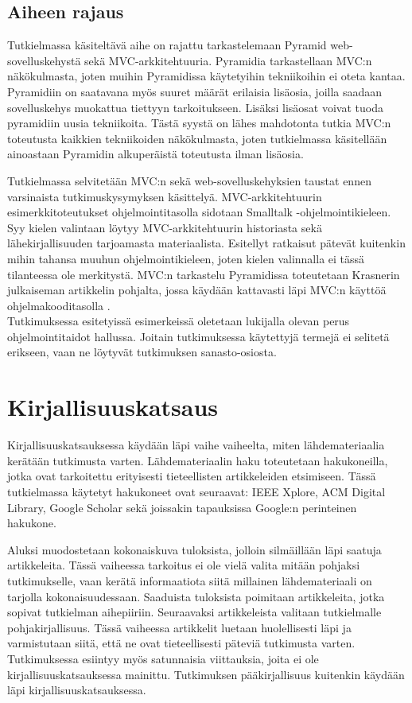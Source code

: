 \documentclass[finnish,utf8,nonumbib,palatino,kandi]{gradu2}
\begin{document}
\subsection{Aiheen rajaus}
Tutkielmassa käsiteltävä aihe on rajattu tarkastelemaan Pyramid web-sovelluskehystä sekä MVC-arkkitehtuuria. Pyramidia
tarkastellaan MVC:n näkökulmasta, joten muihin Pyramidissa käytetyihin tekniikoihin ei oteta kantaa. Pyramidiin on saatavana myös suuret määrät erilaisia lisäosia, 
joilla saadaan sovelluskehys muokattua tiettyyn tarkoitukseen. 
Lisäksi lisäosat voivat tuoda pyramidiin uusia tekniikoita. Tästä syystä on lähes mahdotonta tutkia MVC:n toteutusta kaikkien tekniikoiden näkökulmasta, 
joten tutkielmassa käsitellään ainoastaan Pyramidin alkuperäistä toteutusta ilman lisäosia.

Tutkielmassa selvitetään MVC:n sekä web-sovelluskehyksien taustat ennen varsinaista tutkimuskysymyksen käsittelyä. MVC-arkkitehtuurin esimerkkitoteutukset ohjelmointitasolla sidotaan Smalltalk -ohjelmointikieleen. 
Syy kielen valintaan löytyy MVC-arkkitehtuurin historiasta sekä lähekirjallisuuden tarjoamasta materiaalista. Esitellyt ratkaisut
pätevät kuitenkin mihin tahansa muuhun ohjelmointikieleen, joten kielen valinnalla ei tässä tilanteessa ole merkitystä. 
 MVC:n tarkastelu Pyramidissa toteutetaan Krasnerin julkaiseman artikkelin pohjalta, jossa käydään kattavasti läpi MVC:n käyttöä ohjelmakooditasolla \cite{Krasner:desc}.  \\

Tutkimuksessa esitetyissä esimerkeissä oletetaan lukijalla olevan perus ohjelmointitaidot hallussa. Joitain tutkimuksessa käytettyjä termejä ei selitetä erikseen, vaan ne löytyvät tutkimuksen sanasto-osiosta.

\section{Kirjallisuuskatsaus}
Kirjallisuuskatsauksessa käydään läpi vaihe vaiheelta, miten lähdemateriaalia kerätään
tutkimusta varten. Lähdemateriaalin haku toteutetaan hakukoneilla, jotka ovat tarkoitettu
erityisesti tieteellisten artikkeleiden etsimiseen. Tässä tutkielmassa käytetyt hakukoneet ovat seuraavat:
IEEE Xplore, ACM Digital Library, Google Scholar sekä joissakin tapauksissa Google:n perinteinen hakukone.

Aluksi muodostetaan kokonaiskuva tuloksista, jolloin silmäillään läpi saatuja artikkeleita. Tässä 
vaiheessa tarkoitus ei ole vielä valita mitään pohjaksi tutkimukselle, vaan kerätä informaatiota
siitä millainen lähdemateriaali on tarjolla kokonaisuudessaan. Saaduista tuloksista poimitaan artikkeleita,
jotka sopivat tutkielman aihepiiriin. Seuraavaksi artikkeleista valitaan tutkielmalle pohjakirjallisuus. Tässä vaiheessa artikkelit luetaan huolellisesti
läpi ja varmistutaan siitä, että ne ovat tieteellisesti päteviä tutkimusta varten. Tutkimuksessa esiintyy myös
satunnaisia viittauksia, joita ei ole kirjallisuuskatsauksessa mainittu. Tutkimuksen pääkirjallisuus kuitenkin käydään läpi kirjallisuuskatsauksessa.
\end{document}
